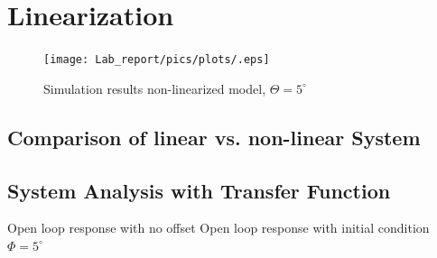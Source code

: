 \section{Linearization}

\begin{figure}[H]
    \centering
    \texttt{[image: Lab\_report/pics/plots/.eps]}
    \caption{Simulation results non-linearized model, $\Theta=5^\circ$}
    \label{fig:sim_res_non_lin_t_5_inc_fric}
\end{figure}


\subsection{Comparison of linear vs. non-linear System}

\subsection{System Analysis with Transfer Function}

Open loop response with no offset
Open loop response with initial condition $\Phi = 5^\circ$